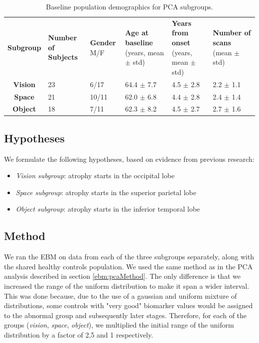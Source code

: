 \begin{table}
\centering
\begin{tabular}{ c |C{1.7cm} | C{1.7cm} | C{2.5cm} | C{2.5cm} | C{2.5cm}} 
\textbf{Subgroup} & \textbf{Number of Subjects} & \textbf{Gender} \hspace{1cm} M/F & \textbf{Age at baseline} \hspace{1cm} (years, mean $\pm$ std) & \textbf{Years from onset} (years, mean $\pm$ std) & \textbf{Number of scans} (mean $\pm$ std)\\
\textbf{Vision} & 23 & 6/17 & 64.4 $\pm$ 7.7 & 4.5 $\pm$ 2.8 & 2.2 $\pm$ 1.1\\ 
\textbf{Space} & 21 & 10/11 & 62.0 $\pm$ 6.8 & 4.4 $\pm$ 2.8 & 2.4 $\pm$ 1.4\\ 
\textbf{Object} & 18 & 7/11 & 62.3 $\pm$ 8.2 & 4.5 $\pm$ 2.7 & 2.7 $\pm$ 1.6\\ 
\end{tabular}
\caption[Baseline population demographics for PCA subgroups]{Baseline population demographics for PCA subgroups.}
\label{tab:subgroup_demographics}
\end{table}
 
\subsection{Hypotheses}

We formulate the following hypotheses, based on evidence from previous research\cite{ross1996progressive,galton2000atypical}:
\begin{itemize}
 \item \emph{Vision subgroup}: atrophy starts in the occipital lobe
 \item \emph{Space subgroup}: atrophy starts in the superior parietal lobe
 \item \emph{Object subgroup}: atrophy starts in the inferior temporal lobe
\end{itemize}

\subsection{Method}

We ran the EBM on data from each of the three subgroups separately, along with the shared healthy controls population. We used the same method as in the PCA analysis described in section \ref{ebm:pcaMethod}. The only difference is that we increased the range of the uniform distribution to make it span a wider interval. This was done because, due to the use of a gaussian and uniform mixture of distributions, some controls with "very good" biomarker values would be assigned to the abnormal group and subsequently later stages. Therefore, for each of the groups (\emph{vision}, \emph{space}, \emph{object}), we multiplied the initial range of the uniform distribution by a factor of 2,5 and 1 respectively.

